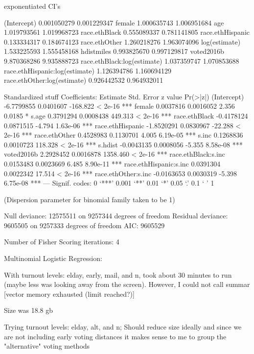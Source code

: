 exponentiated CI's

(Intercept)                    0.001050279 0.001229347
female                         1.000635743 1.006951684
age                            1.019793561 1.019968723
race.ethBlack                  0.555089337 0.781141805
race.ethHispanic               0.133334317 0.184674123
race.ethOther                  1.260218276 1.963074096
log(estimate)                  1.533225593 1.555458168
hdistmiles                     0.993825670 0.997129817
voted2016b                     9.870368286 9.935888723
race.ethBlack:log(estimate)    1.037359747 1.070853688
race.ethHispanic:log(estimate) 1.126394786 1.160694129
race.ethOther:log(estimate)    0.926442532 0.964932011

Standardized stuff
Coefficients:
                         Estimate Std. Error  z value Pr(>|z|)
(Intercept)            -6.7799855  0.0401607 -168.822  < 2e-16 ***
female                  0.0037816  0.0016052    2.356   0.0185 *
s.age                   0.3791294  0.0008438  449.313  < 2e-16 ***
race.ethBlack          -0.4178124  0.0871515   -4.794 1.63e-06 ***
race.ethHispanic       -1.8520291  0.0830967  -22.288  < 2e-16 ***
race.ethOther           0.4528983  0.1130701    4.005 6.19e-05 ***
s.inc                   0.1268836  0.0010723  118.328  < 2e-16 ***
s.hdist                -0.0043135  0.0008056   -5.355 8.58e-08 ***
voted2016b              2.2928452  0.0016878 1358.460  < 2e-16 ***
race.ethBlack:s.inc     0.0153483  0.0023669    6.485 8.90e-11 ***
race.ethHispanic:s.inc  0.0391304  0.0022342   17.514  < 2e-16 ***
race.ethOther:s.inc    -0.0163653  0.0030319   -5.398 6.75e-08 ***
---
Signif. codes:  0 ‘***’ 0.001 ‘**’ 0.01 ‘*’ 0.05 ‘.’ 0.1 ‘ ’ 1

(Dispersion parameter for binomial family taken to be 1)

    Null deviance: 12575511  on 9257344  degrees of freedom
Residual deviance:  9605505  on 9257333  degrees of freedom
AIC: 9605529

Number of Fisher Scoring iterations: 4


Multinomial Logistic Regression:

With turnout levels: elday, early, mail, and n,
took about 30 minutes to run (maybe less was looking away from the screen).
However, I could not call summar [vector memory exhausted (limit reached?)]

Size was 18.8 gb

Trying turnout levels: elday, alt, and n;
Should reduce size ideally and since we are not including early voting distances
it makes sense to me to group the "alternative" voting methods



